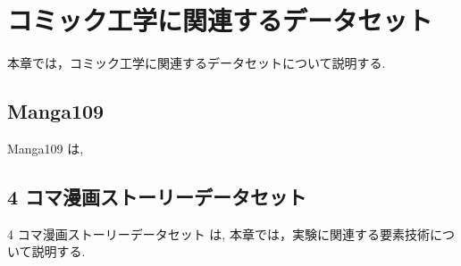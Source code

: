 \newpage
\changeindent{0cm}
\section{コミック工学に関連するデータセット}
\changeindent{2cm}

本章では，コミック工学に関連するデータセットについて説明する.

\changeindent{0cm}
\subsection{Manga109}
\changeindent{2cm}

Manga109 \cite{mtap_matsui_2017} は,

\changeindent{0cm}
\subsection{4 コマ漫画ストーリーデータセット}
\changeindent{2cm}

4 コマ漫画ストーリーデータセット \cite{ueno_miki2018} は, 本章では，実験に関連する要素技術について説明する.
